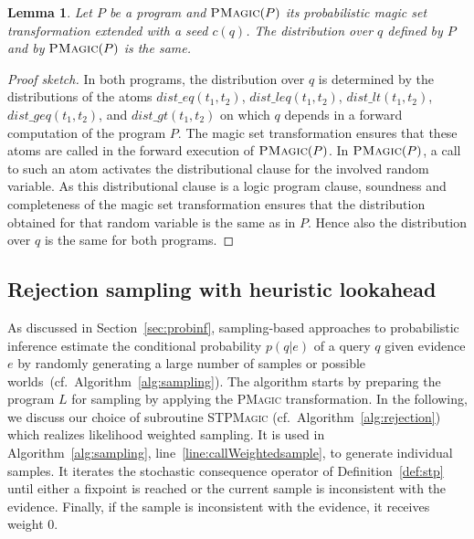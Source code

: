 \documentclass{tlp}
\newtheorem{lemma}{Lemma}
\begin{document}
\begin{lemma}
 Let $P$ be a program and $\textsc{PMagic}(P)$ its probabilistic
  magic set transformation extended with a seed $c(q)$.  The
  distribution over $q$ defined by $P$ and by $\textsc{PMagic}(P)$ is
  the same.
\end{lemma}

\begin{proof}[Proof sketch]
  In both programs, the distribution over $q$ is determined by the
  distributions of the atoms $dist\_eq(t_1,t_2)$,
  $dist\_leq(t_1,t_2)$, $dist\_lt(t_1,t_2)$, $dist\_geq(t_1,t_2)$, and
  $dist\_gt(t_1,t_2)$ on which $q$ depends in a forward computation of
  the program $P$. The magic set transformation ensures that these
  atoms are called in the forward execution of $\textsc{PMagic}(P)$.
  In $\textsc{PMagic}(P)$, a call to such an atom activates the
  distributional clause for the involved random variable. As this
  distributional clause is a logic program clause, soundness and
  completeness of the magic set transformation ensures that the
  distribution obtained for that random variable is the same as in
  $P$.  Hence also the distribution over $q$ is the same for both
  programs.
\end{proof}


\subsection{Rejection sampling with heuristic lookahead}

As discussed in Section~\ref{sec:probinf}, sampling-based approaches
to probabilistic inference estimate the conditional probability
$p(q|e)$ of a query $q$ given evidence $e$ by randomly generating a
large number of samples or possible
worlds~(cf.~Algorithm~\ref{alg:sampling}). The algorithm starts by
preparing the program $L$ for sampling by applying the \textsc{PMagic}
transformation.  In the following, we discuss our choice of subroutine
\textsc{STPMagic} (cf.~Algorithm~\ref{alg:rejection}) which realizes
likelihood weighted sampling.  It is used in
Algorithm~\ref{alg:sampling}, line~\ref{line:callWeightedsample}, to
generate individual samples. It iterates the stochastic consequence
operator of Definition~\ref{def:stp} until either a fixpoint is
reached or the current sample is inconsistent with the
evidence. Finally, if the sample is inconsistent with the evidence, it
receives weight 0.
\end{document}
